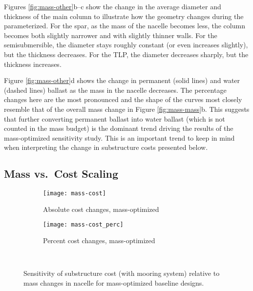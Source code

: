Figures \ref{fig:mass-other}b--c show the change in the average diameter
and thickness of the main column to illustrate how the geometry changes
during the parameterized.  For the spar, as the mass of the nacelle
becomes less, the column becomes both slightly narrower and with
slightly thinner walls.  For the semisubmersible, the diameter stays
roughly constant (or even increases slightly), but the thickness
decreases.  For the TLP, the diameter decreases sharply, but the
thickness increases.

Figure \ref{fig:mass-other}d shows the change in permanent (solid lines)
and water (dashed lines) ballast as the mass in the nacelle decreases.
The percentage changes here are the most pronounced and the shape of the
curves most closely resemble that of the overall mass change in Figure
\ref{fig:mass-mass}b.  This suggests that further converting permanent
ballast into water ballast (which is not counted in the mass budget) is
the dominant trend driving the results of the mass-optimized sensitivity
study.  This is an important trend to keep in mind when interpreting the
change in substructure costs presented below.


\subsection{Mass vs.~Cost Scaling}

\begin{figure}[htbp]
  \begin{subfigure}[b]{0.49\linewidth}
    \centering \texttt{[image: mass-cost]}
    \caption{Absolute cost changes, mass-optimized}
  \end{subfigure}
  \begin{subfigure}[b]{0.49\linewidth}
    \centering \texttt{[image: mass-cost\_perc]}
    \caption{Percent cost changes, mass-optimized}
  \end{subfigure}\\
  \caption{Sensitivity of substructure cost (with mooring system)
    relative to mass changes in nacelle for mass-optimized baseline designs.}
  \label{fig:mass-cost}
\end{figure}

